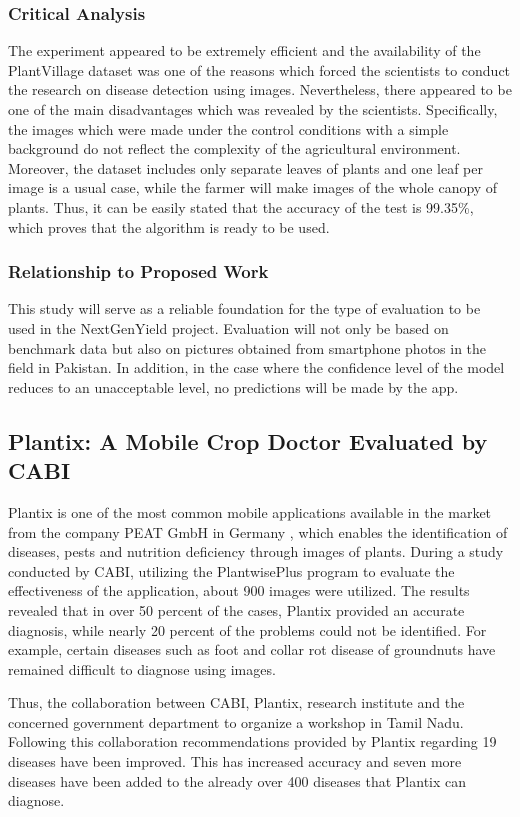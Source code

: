 \documentclass{FastFyp}
\begin{document}
\subsubsection{Critical Analysis}
The experiment appeared to be extremely efficient and the availability of the PlantVillage dataset was one of the reasons which forced the scientists to conduct the research on disease detection using images. Nevertheless, there appeared to be one of the main disadvantages which was revealed by the scientists. Specifically, the images which were made under the control conditions with a simple background do not reflect the complexity of the agricultural environment. Moreover, the dataset includes only separate leaves of plants and one leaf per image is a usual case, while the farmer will make images of the whole canopy of plants. Thus, it can be easily stated that the accuracy of the test is 99.35\%, which proves that the algorithm is ready to be used.

\subsubsection{Relationship to Proposed Work}
This study will serve as a reliable foundation for the type of evaluation to be used in the NextGenYield project. Evaluation will not only be based on benchmark data but also on pictures obtained from smartphone photos in the field in Pakistan. In addition, in the case where the confidence level of the model reduces to an unacceptable level, no predictions will be made by the app.

\subsection{Plantix: A Mobile Crop Doctor Evaluated by CABI}
Plantix is one of the most common mobile applications available in the market from the company PEAT GmbH in Germany \cite{ref:CABI:2020}, which enables the identification of diseases, pests and nutrition deficiency through images of plants. During a study conducted by CABI, utilizing the PlantwisePlus program to evaluate the effectiveness of the application, about 900 images were utilized. The results revealed that in over 50 percent of the cases, Plantix provided an accurate diagnosis, while nearly 20 percent of the problems could not be identified. For example, certain diseases such as foot and collar rot disease of groundnuts have remained difficult to diagnose using images.

Thus, the collaboration between CABI, Plantix, research institute and the concerned government department to organize a workshop in Tamil Nadu. Following this collaboration recommendations provided by Plantix regarding 19 diseases have been improved. This has increased accuracy and seven more diseases have been added to the already over 400 diseases that Plantix can diagnose.
\end{document}
